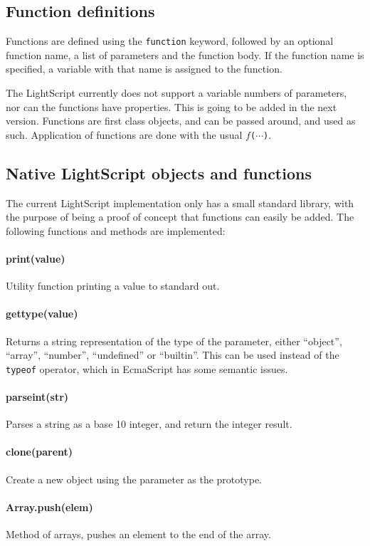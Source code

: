 \documentclass[11pt]{report}
\begin{document}
\subsection{Function definitions}
Functions are defined using the \verb|function| keyword, followed by an optional function name, a list of parameters and the function body.
If the function name is specified, a variable with that name is assigned to the function.

The LightScript currently does not support a variable numbers of parameters, nor can the functions have properties.
This is going to be added in the next version.
Functions are first class objects, and can be passed around, and used as such. Application of functions are done with the usual $f$\verb|(|$\cdots$\verb|)|.

\subsection{Native LightScript objects and functions}
The current LightScript implementation only has a small standard library, with the purpose of being a proof of concept that functions can easily be added. The following functions and methods are implemented:

\paragraph{print(value)} Utility function printing a value to standard out.
\paragraph{gettype(value)} Returns a string representation of the type of the parameter, either ``object'', ``array'', ``number'', ``undefined'' or ``builtin''. This can be used instead of the \verb|typeof| operator, which in EcmaScript has some semantic issues.
\paragraph{parseint(str)} Parses a string as a base 10 integer, and return the integer result.
\paragraph{clone(parent)} Create a new object using the parameter as the prototype.
\paragraph{Array.push(elem)} Method of arrays, pushes an element to the end of the array.
\end{document}
